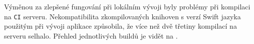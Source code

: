 Výměnou za zlepšené fungování při lokálním vývoji byly problémy při kompilaci na \texttt{CI} serveru.
Nekompatibilita zkompilovaných knihoven s verzí Swift jazyka použitým při vývoji aplikace způsobila, že více než dvě třetiny kompilací na serveru selhalo.
Přehled jednotlivých buildů je vidět na \cite{travis-octophone-builds}.
